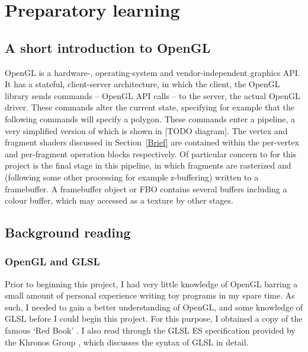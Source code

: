 \documentclass[12pt,twoside,notitlepage]{report}
\begin{document}
\begin{figure}
\label{depend}
\end{figure}

\section{Preparatory learning}
\subsection{A short introduction to OpenGL}
OpenGL is a hardware-, operating-system and vendor-independent graphics API. It has a stateful, client-server architecture, in which the client, the OpenGL library sends commands -- OpenGL API calls -- to the server, the actual OpenGL driver. These commands alter the current state, specifying for example that the following commands will specify a polygon. These commands enter a pipeline, a very simplified version of which is shown in [TODO diagram]. The vertex and fragment shaders discussed in Section~\ref{Brief} are contained within the per-vertex and per-fragment operation blocks respectively. Of particular concern to for this project is the final stage in this pipeline, in which fragments are rasterized and (following some other processing for example z-buffering) written to a framebuffer. A framebuffer object or FBO contains several buffers including a colour buffer, which may accessed as a texture by other stages.

\subsection{Background reading}

\subsubsection{OpenGL and GLSL}
Prior to beginning this project, I had very little knowledge of OpenGL barring a small amount of personal experience writing toy programs in my spare time. As such, I needed to gain a better understanding of OpenGL, and some knowledge of GLSL before I could begin this project. For this purpose, I obtained a copy of the famous `Red Book' \cite{redbook}. I also read through the GLSL ES specification provided by the Khronos Group \cite{glsl-spec}, which discusses the syntax of GLSL in detail.
\end{document}
